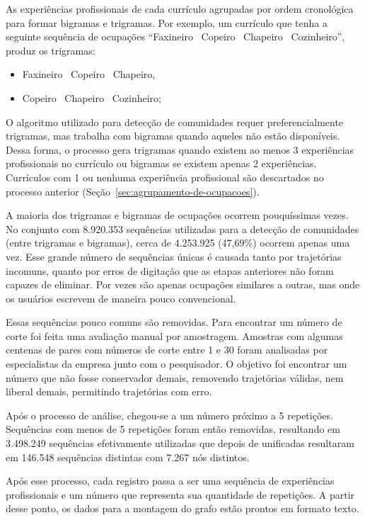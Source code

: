 \documentclass[12pt,a4paper]{article}
\begin{document}
As experiências profissionais de cada currículo agrupadas por ordem cronológica para formar bigramas e trigramas. Por exemplo, um currículo que tenha a seguinte sequência de ocupações \enquote{Faxineiro \textrightarrow~Copeiro \textrightarrow~Chapeiro \textrightarrow~Cozinheiro}, produz os trigramas:
\begin{itemize}
    \item  Faxineiro \textrightarrow~Copeiro \textrightarrow~Chapeiro,
    \item Copeiro \textrightarrow~Chapeiro \textrightarrow~Cozinheiro;
\end{itemize}

O algoritmo utilizado para detecção de comunidades requer preferencialmente trigramas, mas trabalha com bigramas quando aqueles não estão disponíveis. Dessa forma, o processo gera trigramas quando existem ao menos 3 experiências profissionais no currículo ou bigramas se existem apenas 2 experiências. Currículos com 1 ou nenhuma experiência profissional são descartados no processo anterior (Seção~\ref{sec:agrupamento-de-ocupacoes}).

A maioria dos trigramas e bigramas de ocupações ocorrem pouquíssimas vezes. No conjunto com 8.920.353 sequências utilizadas para a detecção de comunidades (entre trigramas e bigramas), cerca de 4.253.925 (47,69\%) ocorrem apenas uma vez. Esse grande número de sequências únicas é causada tanto por trajetórias incomuns, quanto por erros de digitação que as etapas anteriores não foram capazes de eliminar. Por vezes são apenas ocupações similares a outras, mas onde os usuários escrevem de maneira pouco convencional.

Essas sequências pouco comuns são removidas. Para encontrar um número de corte foi feita uma avaliação manual por amostragem. Amostras com algumas centenas de pares com números de corte entre 1 e 30 foram analisadas por especialistas da empresa junto com o pesquisador. O objetivo foi encontrar um número que não fosse conservador demais, removendo trajetórias válidas, nem liberal demais, permitindo trajetórias com erro.

Após o processo de análise, chegou-se a um número próximo a 5 repetições. Sequências com menos de 5 repetições foram então removidas, resultando em 3.498.249 sequências efetivamente utilizadas que depois de unificadas resultaram em 146.548 sequências distintas com 7.267 nós distintos.

Após esse processo, cada registro passa a ser uma sequência de experiências profissionais e um número que representa sua quantidade de repetições. A partir desse ponto, os dados para a montagem do grafo estão prontos em formato texto.
\end{document}
